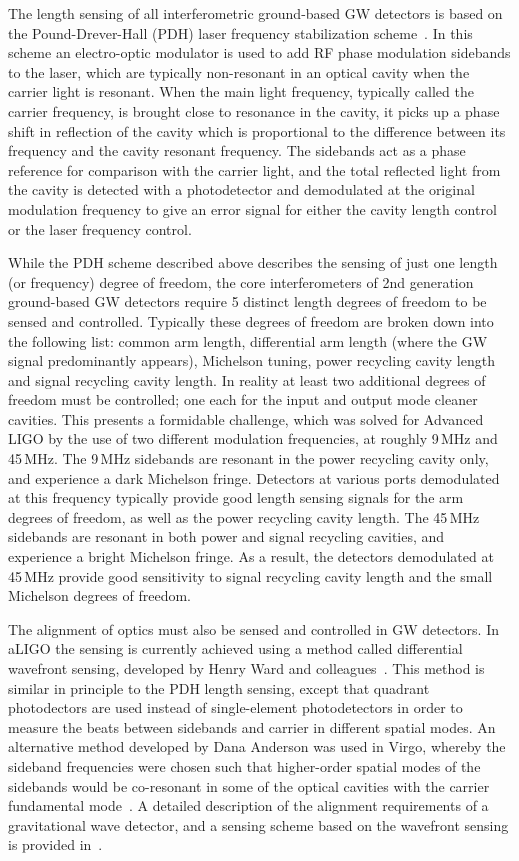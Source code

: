 The length sensing of all interferometric ground-based GW detectors is based on the Pound-Drever-Hall (PDH) laser 
frequency stabilization scheme~\cite{PDH}. 
In this scheme an electro-optic modulator is used to add RF phase modulation sidebands to the laser, 
which are typically non-resonant in an optical cavity when the carrier light is resonant.
When the main light frequency, typically called the carrier frequency, is brought close to resonance in the cavity, 
it picks up a phase shift in reflection of the cavity which is proportional to the difference between its 
frequency and the cavity resonant frequency. The sidebands act as a phase reference for comparison with the 
carrier light, and the total reflected light 
from the cavity is detected with a photodetector and demodulated at the original modulation frequency to give an error 
signal for either the cavity length control or the laser frequency control. 

While the PDH scheme described above describes the sensing of just one length (or frequency) degree of freedom, 
the core interferometers of 2nd generation ground-based GW detectors require 5 distinct length degrees of freedom to 
be sensed and controlled. Typically these degrees of freedom are broken down into the following list: common arm length, 
differential arm length (where the GW signal predominantly appears), Michelson tuning, power recycling cavity length and 
signal recycling cavity length. In reality at least two additional degrees of freedom must be controlled; one each for the input 
and output mode cleaner cavities. This presents a formidable challenge, which was solved for Advanced LIGO by the use of two 
different modulation frequencies, at roughly 9\,MHz and 45\,MHz. The 9\,MHz sidebands are resonant in the power recycling 
cavity only, and experience a dark Michelson fringe. Detectors at various ports demodulated at this frequency typically provide 
good length sensing signals for the arm degrees of freedom, as well as the power recycling cavity length. The 45\,MHz sidebands 
are resonant in both power and signal recycling cavities, and experience a bright Michelson fringe. As a result, the detectors demodulated 
at 45\,MHz provide good sensitivity to signal recycling cavity length and the small Michelson degrees of freedom.

The alignment of optics must also be sensed and controlled in GW detectors. In aLIGO the sensing is currently achieved using a method 
called differential wavefront sensing, developed by Henry Ward and colleagues~\cite{Morrison1994, Morrison1994b}. 
This method is similar in principle to the PDH length sensing, 
except that quadrant photodectors are used 
instead of single-element photodetectors in order to measure the beats between sidebands and carrier in different spatial modes. An 
alternative method developed by Dana Anderson was used in Virgo, whereby the sideband frequencies were chosen such that higher-order 
spatial modes of the sidebands would be co-resonant in some of the optical cavities with the carrier fundamental mode~\cite{Anderson1984}. 
A detailed description of the alignment requirements of a gravitational wave detector, and a sensing scheme based on the wavefront sensing 
is provided in~\cite{Fritschel1998}.

